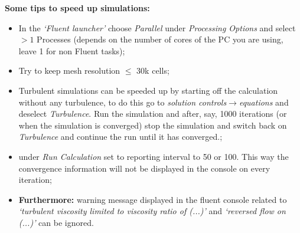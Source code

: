 \documentclass[12pts,a4paper,amsmath,amssymb,floatfix]{article}%
\renewcommand\leq{\leqslant}
\begin{document}
{\bf Some tips to speed up simulations:}
\begin{itemize}
\item In the {\it `Fluent launcher'} choose {\it Parallel} under {\it Processing Options} and select $>1$ Processes (depends on the number of cores of the PC you are using, leave 1 for non Fluent tasks);
\item Try to keep mesh resolution $\leq$ 30k cells;
\item Turbulent simulations can be speeded up by starting off the calculation without any turbulence, to do this go to {\it solution controls$\rightarrow$equations} and deselect {\it Turbulence}. Run the simulation and after, say, 1000 iterations (or when the simulation is converged) stop the simulation and switch back on {\it Turbulence} and continue the run until it has converged.;
\item under {\it Run Calculation} set to reporting interval to 50 or 100. This way the convergence information will not be displayed in the console on every iteration;
\item {\bf Furthermore:} warning message displayed in the fluent console related to {\it `turbulent viscosity limited to viscosity ratio of (...)'} and {\it `reversed flow on (...)'} can be ignored.
\end{itemize}



\clearpage
\end{document}
